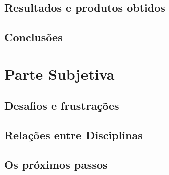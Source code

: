 \documentclass[a4paper,10pt]{article}
\begin{document}
   \subsection{Resultados e produtos obtidos}
   \subsection{Conclusões}

   
  \section{Parte Subjetiva}
  \subsection{Desafios e frustrações}
  \subsection{Relações entre Disciplinas}
  \subsection{Os próximos passos}
  
   
  
\end{document}
